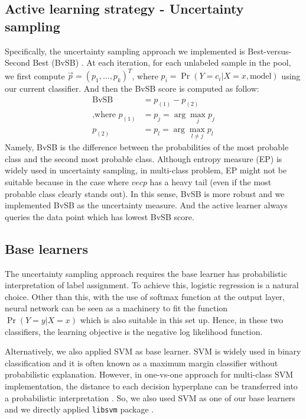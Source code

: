 \documentclass{article}
\begin{document}
\subsection{Active learning strategy - Uncertainty sampling}


Specifically, the uncertainty sampling approach we implemented is Best-versus-Second Best (BvSB) \cite{joshi2009multi}. At each iteration, for each unlabeled sample in the pool, we first compute $\vec{p} = (p_1, ..., p_k)^T$, where $p_i = \Pr(Y = c_i|X = x, \text{model})$ using our current classifier. And then the BvSB score is computed as follow:
\begin{align*}
  \text{BvSB} &= p_{(1)} - p_{(2)} \\
  \text{,where } p_{(1)} &= p_j = \arg\max_{j} p_j \\
  p_{(2)} &= p_l = \arg\max_{l \neq j} p_l
\end{align*}
Namely, BvSB is the difference between the probabilities of the most probable class and the second most probable class. Although entropy measure (EP) is widely used in uncertainty sampling, in multi-class problem, EP might not be suitable because in the case where $vec{p}$ has a heavy tail (even if the most probable class clearly stands out). In this sense, BvSB is more robust and we implemented BvSB as the uncertainty measure. And the active learner always queries the data point which has lowest BvSB score.

\subsection{Base learners}

The uncertainty sampling approach requires the base learner has probabilistic interpretation of label assignment. To achieve this, logistic regression is a natural choice. Other than this, with the use of softmax function at the output layer, neural network can be seen as a machinery to fit the function $\Pr(Y = y|X = x)$ which is also suitable in this set up. Hence, in these two classifiers, the learning objective is the negative log likelihood function. 

Alternatively, we also applied SVM as base learner. SVM is widely used in binary classification and it is often known as a maximum margin classifier without probabilistic explanation. However, in one-vs-one approach for multi-class SVM implementation, the distance to each decision hyperplane can be transferred into a probabilistic interpretation \cite{wu2004probability}. So, we also used SVM as one of our base learners and we directly applied \texttt{libsvm} package \cite{CC01a}.
\end{document}
